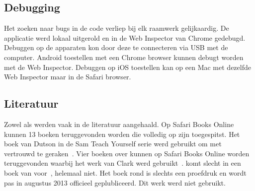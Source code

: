 
\subsection{Debugging}
Het zoeken naar bugs in de code verliep bij elk raamwerk gelijkaardig.
De applicatie werd lokaal uitgerold en in de Web Inspector van Chrome gedebugd.
Debuggen op de apparaten kon door deze te connecteren via USB met de computer.
Android toestellen met een Chrome browser kunnen debugt worden met de Web Inspector.
Debuggen op iOS toestellen kan op een Mac met dezelfde Web Inspector maar in de Safari browser.

\subsection{Literatuur}
Zowel \jqm{} als \st{} werden vaak in de literatuur aangehaald.
Op Safari Books Online kunnen 13 boeken teruggevonden worden die volledig op \jqm{} zijn toegespitst.
Het boek van Dutson in de Sam Teach Yourself serie werd gebruikt om met \jqm{} vertrouwd te geraken~\cite{PhilDutson2012}.
Vier boeken over \st{} kunnen op Safari Books Online worden teruggevonden waarbij het werk van Clark werd gebruikt~\cite{JohnEClark2012}.
\kendo{} komt slecht in een boek van voor~\cite{Bhandari2013},  \lungo{} helemaal niet.
Het boek rond \kendo{} is slechts een proefdruk en wordt pas in augustus 2013 officieel geplubliceerd.
Dit werk werd niet gebruikt.


